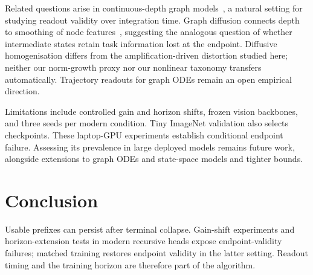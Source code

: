 \documentclass{article}
\theoremstyle{remark}
\begin{document}
Related questions arise in continuous-depth graph models~\citep{poli2019graph}, a natural setting for
studying readout validity over integration time. Graph diffusion connects
depth to smoothing of node features~\citep{chamberlain2021grand}, suggesting
the analogous question of whether intermediate states retain task information
lost at the endpoint. Diffusive homogenisation differs from the
amplification-driven distortion studied here; neither our norm-growth proxy
nor our nonlinear taxonomy transfers automatically. Trajectory readouts for
graph ODEs remain an open empirical direction.

Limitations include controlled gain and horizon shifts, frozen vision
backbones, and three seeds per modern condition. Tiny ImageNet validation also
selects checkpoints. These laptop-GPU experiments establish conditional
endpoint failure. Assessing its prevalence in large deployed models remains
future work, alongside extensions to graph ODEs and state-space models and
tighter bounds.


\section{Conclusion}

Usable prefixes can persist after terminal collapse. Gain-shift experiments
and horizon-extension tests in modern recursive heads expose endpoint-validity
failures; matched training restores endpoint validity in the latter setting.
Readout timing and the training horizon are therefore part of the algorithm.

\clearpage

% 
\end{document}
